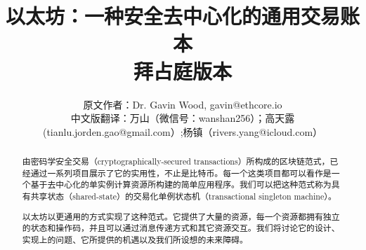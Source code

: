 \documentclass[9pt,oneside]{amsart}
\title{以太坊：一种安全去中心化的通用交易账本 \\ {\smaller \textbf{拜占庭版本 \YellowPaperVersionNumber}}}
\author{
    原文作者：Dr. Gavin Wood, gavin@ethcore.io\\
    中文版翻译：万山（微信号：wanshan256）；高天露(tianlu.jorden.gao@gmail.com）;杨镇（rivers.yang@icloud.com）
}
\begin{document}
\pagecolor{pagecolor}

\begin{abstract}
由密码学安全交易（cryptographically-secured transactions）所构成的区块链范式，已经通过一系列项目展示了它的实用性，不止是比特币。每一个这类项目都可以看作是一个基于去中心化的单实例计算资源所构建的简单应用程序。我们可以把这种范式称为具有共享状态（shared-state）的交易化单例状态机（transactional singleton machine）。

以太坊以更通用的方式实现了这种范式。它提供了大量的资源，每一个资源都拥有独立的状态和操作码，并且可以通过消息传递方式和其它资源交互。我们将讨论它的设计、实现上的问题、它所提供的机遇以及我们所设想的未来障碍。
\end{abstract}

\maketitle
\end{document}
